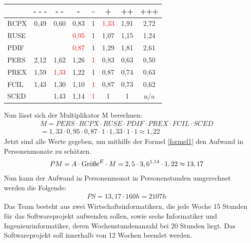 \documentclass[../review_3.tex]{subfiles}
\begin{document}
\begin{center}
    \begin{tabular} [h] {|l|c|c|c|c|c|c|c|}
        \hline & \textbf{- - -} & \textbf{- -}          & \textbf{-}            & \textbf{\textasciitilde} & \textbf{+}            & \textbf{++} & \textbf{+++} \\ \hline
        RCPX   & 0,49           & 0,60                  & 0,83                  & 1                        & \textcolor{red}{1,33} & 1,91        & 2,72         \\ \hline
        RUSE   &                &                       & \textcolor{red}{0,95} & 1                        & 1,07                  & 1,15        & 1,24         \\\hline
        PDIF   &                &                       & \textcolor{red}{0,87} & 1                        & {1,29}                & 1,81        & 2,61         \\ \hline
        PERS   & 2,12           & 1,62                  & {1,26}                & \textcolor{red}{1}       & 0,83                  & 0,63        & 0,50         \\ \hline
        PREX   & 1,59           & \textcolor{red}{1,33} & 1,22                  & 1                        & 0,87                  & 0,74        & 0,63         \\ \hline
        FCIL   & 1,43           & 1,30                  & 1,10                  & \textcolor{red}{1}       & 0,87                  & 0,73        & 0,62         \\ \hline
        SCED   &                & 1,43                  & {1,14}                & \textcolor{red}{1}       & 1                     & 1           & n/a          \\ \hline
    \end{tabular}
\end{center}
Nun lässt sich der Multiplikator M berechnen:
\begin{align*}
    M = PERS \cdot RCPX \cdot RUSE \cdot PDIF \cdot PREX \cdot FCIL \cdot SCED \\= 1,33 \cdot 0,95 \cdot 0,87 \cdot1 \cdot 1,33 \cdot 1 \cdot 1 \approx 1,22
\end{align*}
Jetzt sind alle Werte gegeben, um mithilfe der Formel \ref{formel1} den Aufwand in Personenmonate zu schätzen.
\begin{align*}
    PM = A \cdot \text{Größe}^E \cdot M = 2,5 \cdot 3,6 \textsuperscript{1,14} \cdot1,22 \approx 13,17
\end{align*}
Nun kann der Aufwand in Personenmonat in Personenstunden umgerechnet werden die Folgende:
\begin{align*}
    PS= 13,17 \cdot 160h = 2107h
\end{align*}
Das Team besteht aus zwei Wirtschaftsinformatikern, die jede Woche 15 Stunden für das Softwareprojekt aufwenden sollen, sowie sechs Informatiker und Ingenieurinformatiker, deren Wochenstundenanzahl bei 20 Stunden liegt. Das Softwareprojekt soll innerhalb von 12 Wochen beendet werden.
\end{document}
